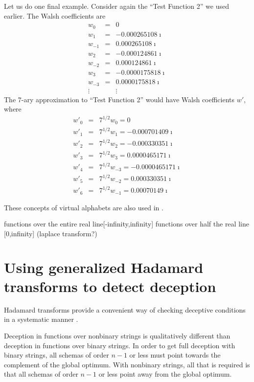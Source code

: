 Let us do one final example.  Consider again the ``Test Function 2'' we
used earlier.  The Walsh coefficients are
\begin{eqnarray}
w_0&=&0  \nonumber\\
w_1&=& -0.000265108 \imath \nonumber\\
w_{-1} &=& 0.000265108 \imath \nonumber\\
w_2&=& -0.000124861 \imath \nonumber \\
w_{-2}&=& 0.000124861 \imath \nonumber\\
w_3 &=& -0.0000175818 \imath  \nonumber\\
w_{-3} &=& 0.0000175818 \imath \nonumber\\
\vdots & & \vdots
\end{eqnarray}
The 7-ary approximation to ``Test Function 2'' would have Walsh coefficients
$w'$, where
\begin{eqnarray}
w'_0 &=& 7^{1/2} w_0 = 0\nonumber \\
w'_1 &=& 7^{1/2} w_1 = -0.000701409 \imath \nonumber\\
w'_2 &=& 7^{1/2} w_2 = -0.000330351 \imath \nonumber\\
w'_3 &=& 7^{1/2} w_3 = 0.0000465171 \imath \nonumber \\
w'_4 &=& 7^{1/2} w_{-3} = -0.0000465171 \imath \nonumber \\
w'_5 &=& 7^{1/2} w_{-2} = 0.000330351 \imath \nonumber\\
w'_6 &=& 7^{1/2} w_{-1} = 0.00070149 \imath
\end{eqnarray}

These concepts of virtual alphabets are also used in \cite{real}.

functions over the entire real line[-infinity,infinity]
functions over half the real line [0,infinity] (laplace transform?)


\section{Using generalized Hadamard transforms to detect deception}
Hadamard transforms provide a convenient way of checking
deceptive conditions in a systematic manner \cite{hadamard}.

Deception in functions over nonbinary strings is qualitatively different than
deception in functions over binary strings.  In order to get full deception
with binary strings, all schemas of order $n-1$ or less must point towards
the complement of the global optimum.  With nonbinary strings, all that
is required is that all schemas of order $n-1$ or less point away from the
global optimum.

